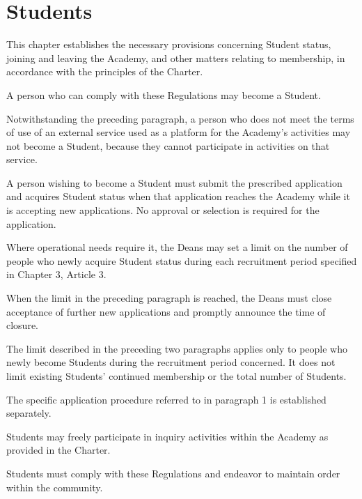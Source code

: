 \newpage
\chapter{Students}
\begin{articles}
  \item This chapter establishes the necessary provisions concerning Student status, joining and leaving the Academy, and other matters relating to membership, in accordance with the principles of the Charter.
  \item A person who can comply with these Regulations may become a Student.
  \begin{paragraphs}
    \item Notwithstanding the preceding paragraph, a person who does not meet the terms of use of an external service used as a platform for the Academy's activities may not become a Student, because they cannot participate in activities on that service.
  \end{paragraphs}
  \item A person wishing to become a Student must submit the prescribed application and acquires Student status when that application reaches the Academy while it is accepting new applications. No approval or selection is required for the application.
  \begin{paragraphs}
    \item Where operational needs require it, the Deans may set a limit on the number of people who newly acquire Student status during each recruitment period specified in Chapter 3, Article 3.
    \item When the limit in the preceding paragraph is reached, the Deans must close acceptance of further new applications and promptly announce the time of closure.
    \item The limit described in the preceding two paragraphs applies only to people who newly become Students during the recruitment period concerned. It does not limit existing Students' continued membership or the total number of Students.
    \item The specific application procedure referred to in paragraph 1 is established separately.
  \end{paragraphs}
  \item Students may freely participate in inquiry activities within the Academy as provided in the Charter.
  \begin{paragraphs}
    \item Students must comply with these Regulations and endeavor to maintain order within the community.

\end{paragraphs}
\end{articles}

